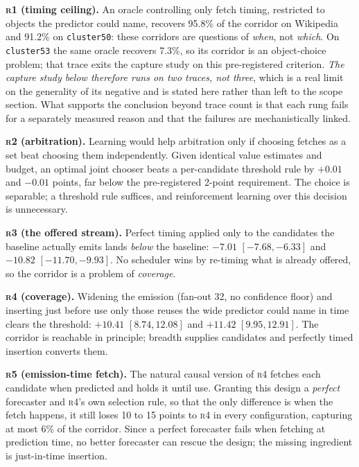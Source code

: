 \documentclass[letterpaper]{article} %
\newcommand{\rung}[1]{\textsc{#1}}
\begin{document}
\textbf{\rung{r1} (timing ceiling).} An oracle controlling only fetch timing, restricted to objects the predictor could name, recovers 95.8\% of the corridor on Wikipedia and 91.2\% on \texttt{cluster50}: these corridors are questions of \emph{when}, not \emph{which}. On \texttt{cluster53} the same oracle recovers 7.3\%, so its corridor is an object-choice problem; that trace exits the capture study on this pre-registered criterion. \emph{The capture study below therefore runs on two traces, not three}, which is a real limit on the generality of its negative and is stated here rather than left to the scope section. What supports the conclusion beyond trace count is that each rung fails for a separately measured reason and that the failures are mechanistically linked.

\textbf{\rung{r2} (arbitration).} Learning would help arbitration only if choosing fetches as a set beat choosing them independently. Given identical value estimates and budget, an optimal joint chooser beats a per-candidate threshold rule by $+0.01$ and $-0.01$ points, far below the pre-registered 2-point requirement. The choice is separable; a threshold rule suffices, and reinforcement learning over this decision is unnecessary.

\textbf{\rung{r3} (the offered stream).} Perfect timing applied only to the candidates the baseline actually emits lands \emph{below} the baseline: $-7.01$ $[-7.68,-6.33]$ and $-10.82$ $[-11.70,-9.93]$. No scheduler wins by re-timing what is already offered, so the corridor is a problem of \emph{coverage}.

\textbf{\rung{r4} (coverage).} Widening the emission (fan-out 32, no confidence floor) and inserting just before use only those reuses the wide predictor could name in time clears the threshold: $+10.41$ $[8.74,12.08]$ and $+11.42$ $[9.95,12.91]$. The corridor is reachable in principle; breadth supplies candidates and perfectly timed insertion converts them.

\textbf{\rung{r5} (emission-time fetch).} The natural causal version of \rung{r4} fetches each candidate when predicted and holds it until use. Granting this design a \emph{perfect} forecaster and \rung{r4}'s own selection rule, so that the only difference is when the fetch happens, it still loses 10 to 15 points to \rung{r4} in every configuration, capturing at most 6\% of the corridor. Since a perfect forecaster fails when fetching at prediction time, no better forecaster can rescue the design; the missing ingredient is just-in-time insertion.
\end{document}
